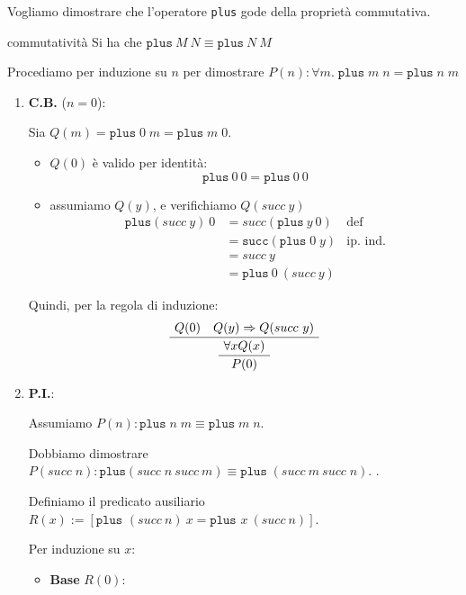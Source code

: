 \documentclass[a4paper,11pt]{report}
\begin{document}
Vogliamo dimostrare che l'operatore \texttt{plus} gode della proprietà commutativa.

\begin{lemmaframe}{commutatività}{}
    Si ha che
    \( \texttt{plus} \ M \ N \equiv \texttt{plus} \ N \ M \)
\end{lemmaframe}

Procediamo per induzione su \(n\) per dimostrare \(P(n): \forall m.\; \texttt{plus}\; m\; n = \mathtt{plus}\; n\; m\)

\begin{enumerate}
    \item \textbf{C.B.} (\(n=0\)): 

        Sia \( Q(m) = \texttt{plus}\; 0\; m = \mathtt{plus}\; m\; 0\).
    \begin{itemize}
        \item \( Q(0) \) è valido per identità: 
            \[ \texttt{plus} \ 0 \ 0 = \texttt{plus} \ 0 \ 0 \]
        \item assumiamo \( Q(y) \), e verifichiamo \( Q(succ \ y) \)
            \[ 
    \begin{array}{rll}
        \texttt{plus} (succ \ y) \ 0 & = succ(\texttt{plus} \ y \ 0) &  \text{def}\\
                                     & = \texttt{succ}(\mathtt{plus}\; 0\; y) & \text{ip. ind.} \\
     & = succ \ y \\
     & = \texttt{plus} \ 0 \ (succ \ y)
    \end{array}
            \]
    \end{itemize}

    Quindi, per la regola di induzione:
    \[ 
        \AxiomC{\( Q(0) \quad Q(y)\Rightarrow Q(succ \ y) \)}
        \UnaryInfC{\( \forall x Q(x) \)}
        \UnaryInfC{\( P(0) \)}
        \DisplayProof
    \]

    \item \textbf{P.I.}:
    
        Assumiamo \(P(n): \texttt{plus}\; n\; m \equiv \mathtt{plus}\; m\; n\).
    
        Dobbiamo dimostrare \(P(succ \; n): \mathtt{plus}(succ \; n \ succ \ m) \equiv \mathtt{plus}\; ( succ \ m \ succ\; n)\).
.

Definiamo il predicato ausiliario $R(x) := [\texttt{plus } (succ \ n) \ x = \texttt{plus } x \ (succ \ n)]$. 

Per induzione su $x$:

\begin{itemize}
    \item \textbf{Base} $R(0)$:


\end{itemize}
\end{enumerate}
\end{document}
